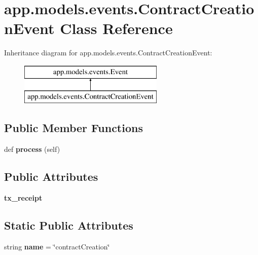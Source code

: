 \hypertarget{classapp_1_1models_1_1events_1_1_contract_creation_event}{}\section{app.\+models.\+events.\+Contract\+Creation\+Event Class Reference}
\label{classapp_1_1models_1_1events_1_1_contract_creation_event}
Inheritance diagram for app.\+models.\+events.\+Contract\+Creation\+Event\+:\begin{figure}[H]
\begin{center}
\leavevmode
\includegraphics[height=2.000000cm]{classapp_1_1models_1_1events_1_1_contract_creation_event}
\end{center}
\end{figure}
\subsection*{Public Member Functions}
\begin{DoxyCompactItemize}
\item 
\mbox{\label{classapp_1_1models_1_1events_1_1_contract_creation_event_aa88606fc7f53fa0e9709ca0adfcf56b5}} 
def {\bfseries process} (self)
\end{DoxyCompactItemize}
\subsection*{Public Attributes}
\begin{DoxyCompactItemize}
\item 
\mbox{\label{classapp_1_1models_1_1events_1_1_contract_creation_event_ac23d1b01edbb4044cfb39b6097cc7ad0}} 
{\bfseries tx\+\_\+receipt}
\end{DoxyCompactItemize}
\subsection*{Static Public Attributes}
\begin{DoxyCompactItemize}
\item 
\mbox{\label{classapp_1_1models_1_1events_1_1_contract_creation_event_a3877c80ec722c55c29a1317f158ea446}} 
string {\bfseries name} = \char`\"{}contract\+Creation\char`\"{}
\end{DoxyCompactItemize}


